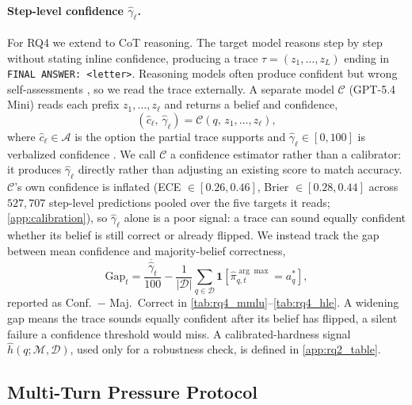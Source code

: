 \paragraph{Step-level confidence $\hat{\gamma}_\ell$.}\label{sec:methods:calibrator}
For RQ4 we extend to CoT reasoning. The target model reasons step by step without stating inline confidence, producing a trace $\tau=(z_1,\ldots,z_L)$ ending in \texttt{FINAL ANSWER: <letter>}. Reasoning models often produce confident but wrong self-assessments \citep{mei2025reasoninguncertainty,yoon2025reasoningconfidence}, so we read the trace externally. A separate model $\mathcal{C}$ (GPT-5.4 Mini) reads each prefix $z_1,\ldots,z_\ell$ and returns a belief and confidence,
\[
(\hat{c}_\ell,\, \hat{\gamma}_\ell) = \mathcal{C}(q,\, z_1,\ldots, z_\ell),
\]
where $\hat{c}_\ell \in \mathcal{A}$ is the option the partial trace supports and $\hat{\gamma}_\ell \in [0,100]$ is verbalized confidence \citep{tian2023justask}. We call $\mathcal{C}$ a confidence estimator rather than a calibrator: it produces $\hat\gamma_\ell$ directly rather than adjusting an existing score to match accuracy. $\mathcal{C}$'s own confidence is inflated (ECE $\in [0.26, 0.46]$, Brier $\in [0.28, 0.44]$ across $527{,}707$ step-level predictions pooled over the five targets it reads; \autoref{app:calibration}), so $\hat\gamma_\ell$ alone is a poor signal: a trace can sound equally confident whether its belief is still correct or already flipped. We instead track the gap between mean confidence and majority-belief correctness,
\[
\mathrm{Gap}_t = \frac{\overline{\hat\gamma}_t}{100} - \frac{1}{|\mathcal{D}|}\sum_{q \in \mathcal{D}} \mathbf{1}[\hat\pi_{q,t}^{\arg\max} = a_q^*],
\]
reported as Conf.\ $-$ Maj.\ Correct in \autoref{tab:rq4_mmlu}--\autoref{tab:rq4_hle}. A widening gap means the trace sounds equally confident after its belief has flipped, a silent failure a confidence threshold would miss. A calibrated-hardness signal $\hat h(q;\mathcal{M},\mathcal{D})$, used only for a robustness check, is defined in \autoref{app:rq2_table}.

\subsection{Multi-Turn Pressure Protocol}
\label{sec:methods:pressure}

